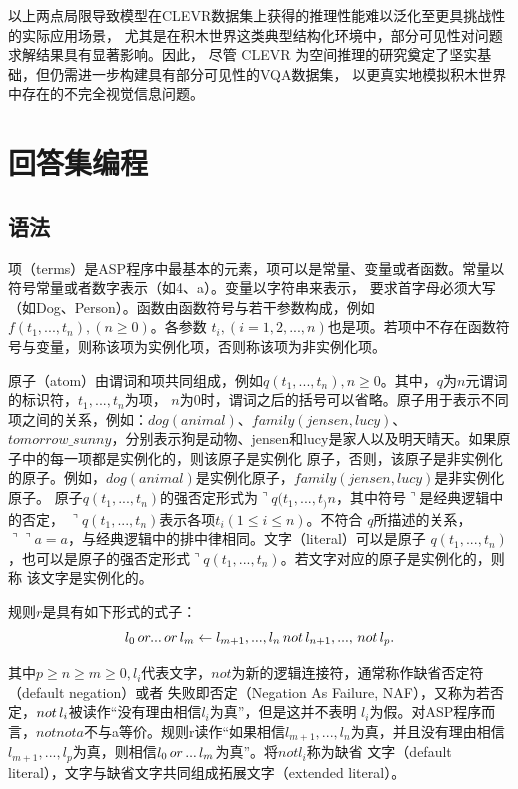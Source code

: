 以上两点局限导致模型在CLEVR数据集上获得的推理性能难以泛化至更具挑战性的实际应用场景，
尤其是在积木世界这类典型结构化环境中，部分可见性对问题求解结果具有显著影响。因此，
尽管 CLEVR 为空间推理的研究奠定了坚实基础，但仍需进一步构建具有部分可见性的VQA数据集，
以更真实地模拟积木世界中存在的不完全视觉信息问题。
\section{回答集编程}
\subsection{语法}
项（terms）是ASP程序中最基本的元素，项可以是常量、变量或者函数。常量以符号常量或者数字表示（如4、a）。变量以字符串来表示，
要求首字母必须大写（如Dog、Person）。函数由函数符号与若干参数构成，例如$f(t_1,...,t_n),(n \geq 0)$。各参数
$t_i,(i=1,2,...,n)$也是项。若项中不存在函数符号与变量，则称该项为实例化项，否则称该项为非实例化项。

原子（atom）由谓词和项共同组成，例如$q(t_1,...,t_n),n \geq 0$。其中，$q$为$n$元谓词的标识符，$t_1,...,t_n$为项，
$n$为0时，谓词之后的括号可以省略。原子用于表示不同项之间的关系，例如：$dog(animal)$、$family(jensen,lucy)$、
$tomorrow\_sunny$，分别表示狗是动物、jensen和lucy是家人以及明天晴天。如果原子中的每一项都是实例化的，则该原子是实例化
原子，否则，该原子是非实例化的原子。例如，$dog(animal)$是实例化原子，$family(jensen,lucy)$是非实例化原子。
原子$q(t_1,...,t_n)$的强否定形式为$\urcorner q(t_1,...,t_)n$，其中符号$\urcorner$是经典逻辑中的否定，
$\urcorner q(t_1,...,t_n)$表示各项$t_i(1 \leq i \leq n)$。不符合
$q$所描述的关系，$\urcorner \urcorner a = a$，与经典逻辑中的排中律相同。文字（literal）可以是原子
$q(t_1,...,t_n)$，也可以是原子的强否定形式$\urcorner q(t_1,...,t_n)$。若文字对应的原子是实例化的，则称
该文字是实例化的。

\begin{definition}[规则] 规则$r$是具有如下形式的式子：
    \begin{equation}
        l_0 \thinspace or ... \thinspace or \thinspace l_m \leftarrow l_{m+1},...,l_n \thinspace not \thinspace l_{n+1},...,\thinspace not \thinspace l_p.
    \end{equation}
\end{definition}

其中$p \ge n \ge m \geq 0, l_i$代表文字，$not$为新的逻辑连接符，通常称作缺省否定符（default negation）或者
失败即否定（Negation As Failure, NAF），又称为若否定，$not \thinspace l_i$被读作“没有理由相信$l_i$为真”，但是这并不表明
$l_i$为假。对ASP程序而言，$not not a$不与a等价。规则r读作“如果相信$l_{m+1},...,l_n$为真，并且没有理由相信
$l_{m+1},...,l_p$为真，则相信$l_0 \thinspace or \thinspace ... \thinspace l_m$为真”。将$not l_i$称为缺省
文字（default literal），文字与缺省文字共同组成拓展文字（extended literal）。

